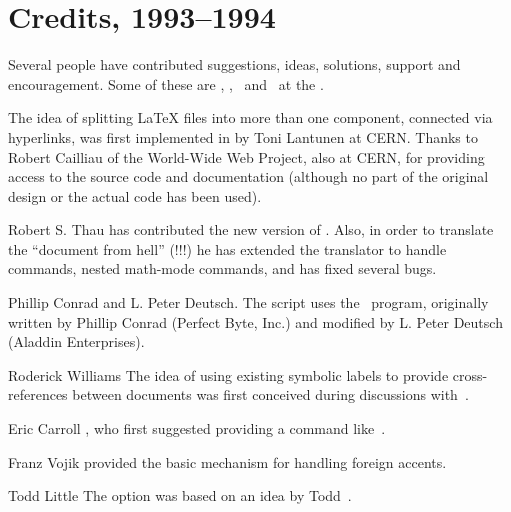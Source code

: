 \section*{Credits, 1993--1994\label{credits}}%
\html{\\}%
Several people have contributed suggestions, ideas, solutions, support
and encouragement. Some of these are \RodWilliams, \AnaPaiva,
\JamilSawar\ and \AndrewCole\ at the \CBLU.

\begin{htmllist}
%
\item [\CERN]
The idea of splitting \LaTeX{}  files
into more than one component, connected via hyperlinks,
was first implemented in \Perl{} by Toni Lantunen at CERN.
Thanks to Robert Cailliau 
of the World-Wide Web Project, also at CERN,
for providing access to the source code and documentation
(although no part of the original design or the actual code has been used).


\item [Robert S. Thau] 
has contributed the new version of .
Also, in order to translate the ``document from hell'' (!!!)
he has extended the translator to handle  commands,
nested math-mode commands, and has fixed several bugs.

\item [Phillip Conrad and L. Peter Deutsch.]
The  \Perl{} script uses the  \PS\ program,
originally written by Phillip Conrad (Perfect Byte, Inc.) and
modified by L. Peter Deutsch (Aladdin Enterprises).

\item [Roderick Williams]
The idea of using existing symbolic labels to provide cross-references
between documents was first conceived during discussions with
\RodWilliams{} \,.


\item [Eric Carroll] ,
who first suggested providing a command like \,.

%

\item [Franz Vojik] 
provided the basic mechanism for handling foreign accents.


\item [Todd Little]
The  option was based on an idea by Todd
\,.



\end{htmllist}
